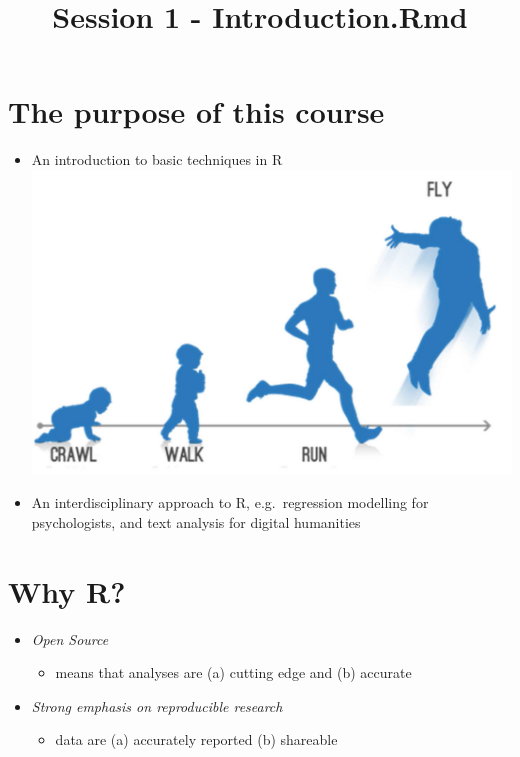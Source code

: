 \documentclass[]{article}
\title{Session 1 - Introduction.Rmd}
\author{}
\date{\vspace{-2.5em}}
\providecommand{\tightlist}{%
  \setlength{\itemsep}{0pt}\setlength{\parskip}{0pt}}
\begin{document}
\maketitle

{
\hypersetup{linkcolor=black}
\setcounter{tocdepth}{2}
\tableofcontents
}
\hypertarget{the-purpose-of-this-course}{%
\section{The purpose of this course}\label{the-purpose-of-this-course}}

\begin{itemize}
\tightlist
\item
  An introduction to basic techniques in R
  \includegraphics{crawl-walk-run-fly.png}
\item
  An interdisciplinary approach to R, e.g.~regression modelling for
  psychologists, and text analysis for digital humanities
\end{itemize}

\hypertarget{why-r}{%
\section{Why R?}\label{why-r}}

\begin{itemize}
\tightlist
\item
  \emph{Open Source}

  \begin{itemize}
  \tightlist
  \item
    means that analyses are (a) cutting edge and (b) accurate
  \end{itemize}
\item
  \emph{Strong emphasis on reproducible research}

  \begin{itemize}
  \tightlist
  \item
    data are (a) accurately reported (b) shareable
  \end{itemize}
\end{itemize}
\end{document}
